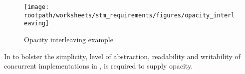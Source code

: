 \begin{figure}[htbp]
\centering
 \texttt{[image: \\rootpath/worksheets/stm\_requirements/figures/opacity\_interleaving]} 
 \caption{Opacity interleaving example}
\label{fig:opacity_interleaving}
\end{figure}

In to bolster the simplicity, level of abstraction, readability and writability of concurrent implementations in \stmname, \stmnamesp is required to supply opacity.

\worksheetend
